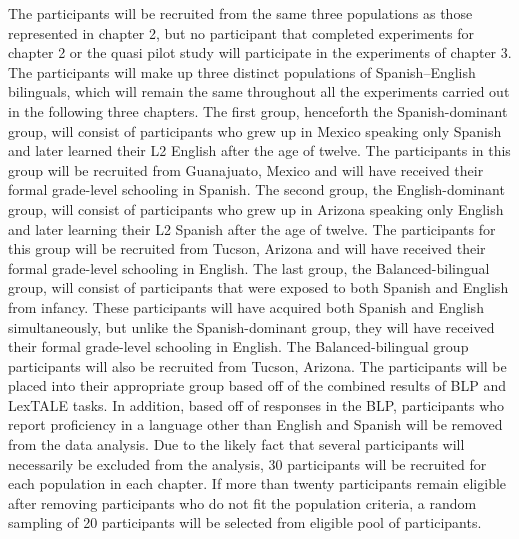 The participants will be recruited from the same three populations as those represented in chapter 2, but no participant that completed experiments for chapter 2 or the quasi pilot study will participate in the experiments of chapter 3. The participants will make up three distinct populations of Spanish–English bilinguals, which will remain the same throughout all the experiments carried out in the following three chapters. The first group, henceforth the Spanish-dominant group, will consist of participants who grew up in Mexico speaking only Spanish and later learned their L2 English after the age of twelve. The participants in this group will be recruited from Guanajuato, Mexico and will have received their formal grade-level schooling in Spanish. The second group, the English-dominant group, will consist of participants who grew up in Arizona speaking only English and later learning their L2 Spanish after the age of twelve. The participants for this group will be recruited from Tucson, Arizona and will have received their formal grade-level schooling in English. The last group, the Balanced-bilingual group, will consist of participants that were exposed to both Spanish and English from infancy. These participants will have acquired both Spanish and English simultaneously, but unlike the Spanish-dominant group, they will have received their formal grade-level schooling in English. The Balanced-bilingual group participants will also be recruited from Tucson, Arizona. The participants will be placed into their appropriate group based off of the combined results of BLP and LexTALE tasks. In addition, based off of responses in the BLP, participants who report proficiency in a language other than English and Spanish will be removed from the data analysis. Due to the likely fact that several participants will necessarily be excluded from the analysis, 30 participants will be recruited for each population in each chapter. If more than twenty participants remain eligible after removing participants who do not fit the population criteria, a random sampling of 20 participants will be selected from eligible pool of participants.


